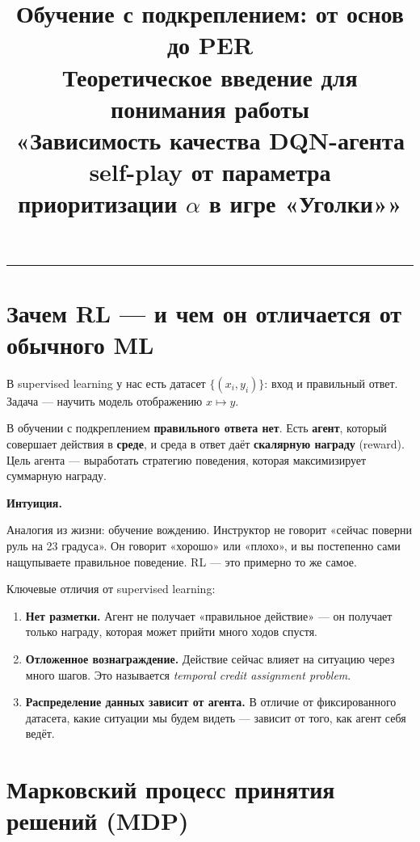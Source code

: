 \documentclass[a4paper, 11pt]{article}
\title{%
  \textbf{Обучение с подкреплением: от основ до PER}\\[6pt]
  \large Теоретическое введение для понимания работы\\
  \normalsize\color{gray}«Зависимость качества DQN-агента self-play
  от параметра приоритизации $\alpha$ в игре «Уголки»»%
}
\author{}
\date{}
\newenvironment{notebox}{%
  \begin{mdframed}[style=notestyle]
  {\bfseries\color{noteborder}Интуиция.}\quad\ignorespaces
}{%
  \end{mdframed}
}
\begin{document}
\maketitle
\vspace{-1em}
{\color{gray}\hrule}
\vspace{0.5em}
\tableofcontents
\newpage

\section{Зачем RL — и чем он отличается от обычного ML}

В supervised learning у нас есть датасет $\{(x_i, y_i)\}$: вход и правильный
ответ. Задача — научить модель отображению $x \mapsto y$.

В обучении с подкреплением \textbf{правильного ответа нет}. Есть \textbf{агент},
который совершает действия в \textbf{среде}, и среда в ответ даёт
\textbf{скалярную награду} (reward). Цель агента — выработать стратегию
поведения, которая максимизирует суммарную награду.

\begin{notebox}
Аналогия из жизни: обучение вождению. Инструктор не говорит «сейчас поверни
руль на 23 градуса». Он говорит «хорошо» или «плохо», и вы постепенно сами
нащупываете правильное поведение. RL — это примерно то же самое.
\end{notebox}

Ключевые отличия от supervised learning:

\begin{enumerate}[itemsep=2pt]
  \item \textbf{Нет разметки.} Агент не получает «правильное действие» —
        он получает только награду, которая может прийти много ходов спустя.
  \item \textbf{Отложенное вознаграждение.} Действие сейчас влияет на
        ситуацию через много шагов. Это называется \emph{temporal credit
        assignment problem}.
  \item \textbf{Распределение данных зависит от агента.} В отличие от
        фиксированного датасета, какие ситуации мы будем видеть —
        зависит от того, как агент себя ведёт.
\end{enumerate}

\section{Марковский процесс принятия решений (MDP)}
\end{document}
